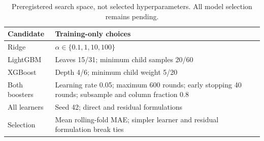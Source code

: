 \begin{table}[t]\centering\caption{Preregistered search space, not selected hyperparameters. All model selection remains pending.}
\begin{tabular}{lp{}}\toprule Candidate & Training-only choices\\\midrule
Ridge & $\alpha\in\{0.1,1,10,100\}$\\
LightGBM & Leaves 15/31; minimum child samples 20/60\\
XGBoost & Depth 4/6; minimum child weight 5/20\\
Both boosters & Learning rate 0.05; maximum 600 rounds; early stopping 40 rounds; subsample and column fraction 0.8\\
All learners & Seed 42; direct and residual formulations\\
Selection & Mean rolling-fold MAE; simpler learner and residual formulation break ties\\
\bottomrule\end{tabular}\end{table}
